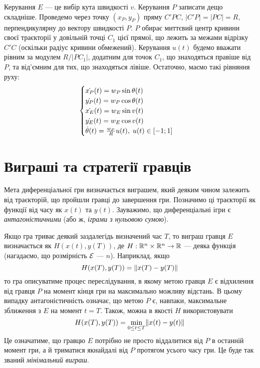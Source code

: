 \begin{example}
    Керування $E$ --- це вибір кута швидкості $v$. Керування $P$ записати дещо складніше. Проведемо через точку $(x_P, y_P)$
    пряму $C' P C$, $|C' P| = |P C| = R$, перпендикулярну до вектору швидкості $P$. $P$ обирає миттєвий центр кривини своєї траєкторії у довільній точці $C_1$ цієї
    прямої, що лежить за межами відрізку $C' C$ (оскільки радіус кривини обмежений). Керування $u(t)$ будемо вважати рівним за модулем
    $R / |P C_1|$, додатним для точок $C_1$, що знаходяться правіше від $P$, та від'ємним для тих, що знаходяться лівіше. Остаточно, маємо такі рівняння руху:
    \begin{gather*}
        \begin{cases}
            \dot{x_P}(t) = w_P \sin \theta(t) \\
            \dot{y_P}(t) = w_P \cos \theta(t) \\
            \dot{x_E}(t) = w_E \sin v(t) \\
            \dot{y_E}(t) = w_E \cos v(t) \\
            \dot{\theta}(t) = \frac{w_P}{R} u(t), \; u(t) \in [-1; 1]
        \end{cases}
    \end{gather*}
\end{example}

\section{Виграші та стратегії гравців}
Мета диференціальної гри визначається виграшем, який деяким чином
залежить від траєкторій, що пройшли гравці до завершення гри. Позначимо ці траєкторії як функції від часу
як $x(t)$ та $y(t)$. Зауважимо, що диференціальні ігри є \emph{антагоністичними} (або ж, \emph{іграми з нульовою сумою}).

Якщо гра триває деякий заздалегідь визначений час $T$, то виграш гравця $E$ визначається
як $H(x(t), y(T))$, де $H : \mathbb{R}^n \times \mathbb{R}^n \to \mathbb{R}$ --- деяка функція (нагадаємо, що розмірність $\mathcal{E}$ --- $n$). Наприклад, якщо
$$H(x(T), y(T)) = \Vert x(T) - y(T) \Vert$$ то гра описуватиме процес переслідування, в якому
метою гравця $E$ є відхилення від гравця $P$ на момент кінця гри на максимально можливу відстань.
В цьому випадку антагоністичність означає, що метою $P$ є, навпаки, максимальне зближення з $E$ на момент $t=T$. 
Також, можна в якості $H$ використовувати $$H(x(T), y(T)) = \underset{0 \leq t \leq T}{\min} \Vert x(t) - y(t) \Vert$$
Це означатиме, що гравцю $E$ потрібно не просто віддалитися від $P$ в останній момент гри,
а й триматися якнайдалі від $P$ протягом усього часу гри. Це буде так званий \emph{мінімальний виграш}.

